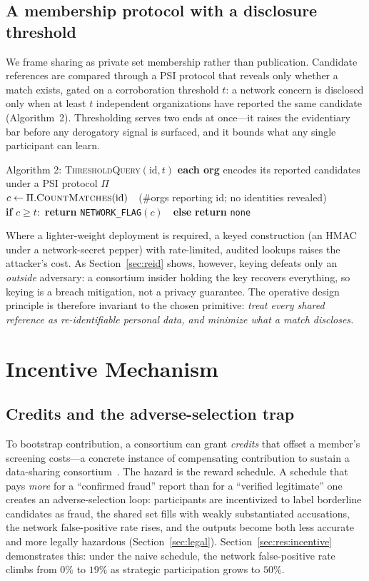 \documentclass[11pt]{article}
\newcommand{\code}[1]{\texttt{\small #1}}
\begin{document}
\subsection{A membership protocol with a disclosure threshold}
We frame sharing as private set membership rather than publication. Candidate
references are compared through a PSI protocol that reveals only whether a match
exists, gated on a corroboration threshold $t$: a network concern is disclosed
only when at least $t$ independent organizations have reported the same candidate
(Algorithm~2). Thresholding serves two ends at once---it raises the
evidentiary bar before any derogatory signal is surfaced, and it bounds what any
single participant can learn.

\begin{algbox}{Algorithm 2: \textsc{ThresholdQuery}$(\mathrm{id}, t)$}
\ttfamily\small
\textbf{each org} encodes its reported candidates under a PSI protocol $\Pi$\\
$c \leftarrow \Pi.\textsc{CountMatches}(\mathrm{id})$\ \ (\#orgs reporting id; no identities revealed)\\
\textbf{if} $c \ge t$:\ \textbf{return} \code{NETWORK\_FLAG}$(c)$\ \ \textbf{else} \textbf{return} \code{none}
\end{algbox}

Where a lighter-weight deployment is required, a keyed construction (an HMAC under
a network-secret pepper) with rate-limited, audited lookups raises the attacker's
cost. As Section~\ref{sec:reid} shows, however, keying defeats only an
\emph{outside} adversary: a consortium insider holding the key recovers
everything, so keying is a breach mitigation, not a privacy guarantee. The
operative design principle is therefore invariant to the chosen primitive:
\emph{treat every shared reference as re-identifiable personal data, and minimize
what a match discloses.}

\section{Incentive Mechanism}\label{sec:incentive}

\subsection{Credits and the adverse-selection trap}
To bootstrap contribution, a consortium can grant \emph{credits} that offset a
member's screening costs---a concrete instance of compensating contribution to
sustain a data-sharing consortium~\cite{datasharing2023}. The hazard is the
reward schedule. A schedule that pays \emph{more} for a ``confirmed fraud'' report
than for a ``verified legitimate'' one creates an adverse-selection loop:
participants are incentivized to label borderline candidates as fraud, the shared
set fills with weakly substantiated accusations, the network false-positive rate
rises, and the outputs become both less accurate and more legally hazardous
(Section~\ref{sec:legal}). Section~\ref{sec:res:incentive} demonstrates this:
under the naive schedule, the network false-positive rate climbs from $0\%$ to
$19\%$ as strategic participation grows to $50\%$.
\end{document}
